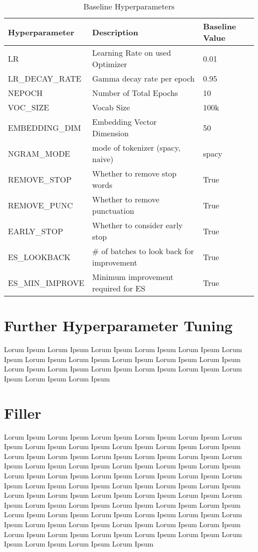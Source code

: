 \documentclass[a4paper,10pt]{article}
\begin{document}
\begin{table}[!htbp]
\begin{tabular}{| l | l | l |}
\hline
Hyperparameter   & Description                                & Baseline Value \\
\hline
LR               & Learning Rate on used Optimizer            & 0.01           \\
LR\_DECAY\_RATE  & Gamma decay rate per epoch                 & 0.95           \\
NEPOCH           & Number of Total Epochs                     & 10             \\
VOC\_SIZE        & Vocab Size                                 & 100k           \\
EMBEDDING\_DIM   & Embedding Vector Dimension                 & 50             \\
NGRAM\_MODE      & mode of tokenizer (spacy, naive)           & spacy          \\
REMOVE\_STOP     & Whether to remove stop words               & True           \\
REMOVE\_PUNC     & Whether to remove punctuation              & True           \\
EARLY\_STOP      & Whether to consider early stop             & True           \\
ES\_LOOKBACK     & \# of batches to look back for improvement & True           \\
ES\_MIN\_IMPROVE & Minimum improvement required for ES        & True           \\
\hline
\end{tabular}
\caption{Baseline Hyperparameters}\label{tbl:hyperparams}
\end{table}

\section{Further Hyperparameter Tuning}
Lorum Ipsum Lorum Ipsum Lorum Ipsum Lorum Ipsum Lorum Ipsum Lorum Ipsum Lorum Ipsum Lorum Ipsum Lorum Ipsum Lorum Ipsum Lorum Ipsum Lorum Ipsum Lorum Ipsum Lorum Ipsum Lorum Ipsum Lorum Ipsum Lorum Ipsum Lorum Ipsum Lorum Ipsum 

\section{Filler}
Lorum Ipsum Lorum Ipsum Lorum Ipsum Lorum Ipsum Lorum Ipsum Lorum Ipsum Lorum Ipsum Lorum Ipsum Lorum Ipsum Lorum Ipsum Lorum Ipsum Lorum Ipsum Lorum Ipsum Lorum Ipsum Lorum Ipsum Lorum Ipsum Lorum Ipsum Lorum Ipsum Lorum Ipsum Lorum Ipsum Lorum Ipsum Lorum Ipsum Lorum Ipsum Lorum Ipsum Lorum Ipsum Lorum Ipsum Lorum Ipsum Lorum Ipsum Lorum Ipsum Lorum Ipsum Lorum Ipsum Lorum Ipsum Lorum Ipsum Lorum Ipsum Lorum Ipsum Lorum Ipsum Lorum Ipsum Lorum Ipsum Lorum Ipsum Lorum Ipsum Lorum Ipsum Lorum Ipsum Lorum Ipsum Lorum Ipsum Lorum Ipsum Lorum Ipsum Lorum Ipsum Lorum Ipsum Lorum Ipsum Lorum Ipsum Lorum Ipsum Lorum Ipsum Lorum Ipsum Lorum Ipsum Lorum Ipsum Lorum Ipsum Lorum Ipsum Lorum Ipsum Lorum Ipsum Lorum Ipsum Lorum Ipsum Lorum Ipsum Lorum Ipsum Lorum Ipsum 

\medskip


\end{document}
